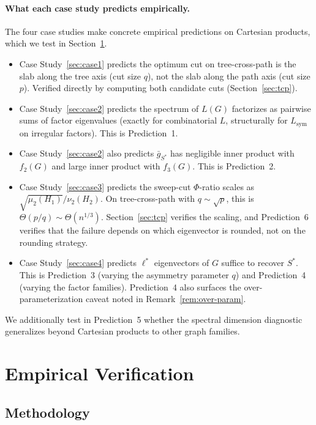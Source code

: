 \documentclass{article}
\theoremstyle{definition}
\theoremstyle{remark}
\begin{document}
\paragraph{What each case study predicts empirically.} The four case studies make concrete empirical predictions on Cartesian products, which we test in Section~\ref{sec:empirical}.
\begin{itemize}
    \item Case Study~\ref{sec:case1} predicts the optimum cut on tree-cross-path is the slab along the tree axis (cut size $q$), not the slab along the path axis (cut size $p$). Verified directly by computing both candidate cuts (Section~\ref{sec:tcp}).
    \item Case Study~\ref{sec:case2} predicts the spectrum of $L(G)$ factorizes as pairwise sums of factor eigenvalues (exactly for combinatorial $L$, structurally for $L_{\mathrm{sym}}$ on irregular factors). This is Prediction~1.
    \item Case Study~\ref{sec:case2} also predicts $\bar g_{S^*}$ has negligible inner product with $f_2(G)$ and large inner product with $f_3(G)$. This is Prediction~2.
    \item Case Study~\ref{sec:case3} predicts the sweep-cut $\Phi$-ratio scales as $\sqrt{\mu_2(H_1)}/\nu_2(H_2)$. On tree-cross-path with $q \sim \sqrt{p}$, this is $\Theta(p/q) \sim \Theta(n^{1/3})$. Section~\ref{sec:tcp} verifies the scaling, and Prediction~6 verifies that the failure depends on which eigenvector is rounded, not on the rounding strategy.
    \item Case Study~\ref{sec:case4} predicts $\ell^*$ eigenvectors of $G$ suffice to recover $S^*$. This is Prediction~3 (varying the asymmetry parameter $q$) and Prediction~4 (varying the factor families). Prediction~4 also surfaces the over-parameterization caveat noted in Remark~\ref{rem:over-param}.
\end{itemize}
We additionally test in Prediction~5 whether the spectral dimension diagnostic generalizes beyond Cartesian products to other graph families.


\section{Empirical Verification}
\label{sec:empirical}

\subsection{Methodology}
\label{sec:methodology}
\end{document}
